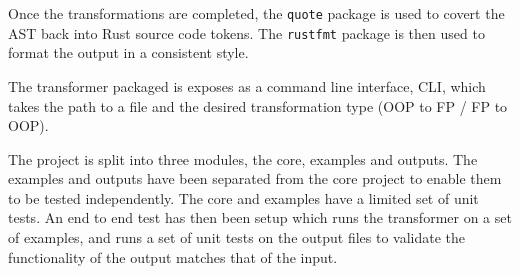 \documentclass[ oneside,%
                    author={James Elgar},
                    degree={MEng},
                     title={Bidirectional transformer between functional and \\ object-oriented programming in Rust},
                  subtitle={}]{dissertation}
\begin{document}
Once the transformations are completed, the \verb|quote| package is used to covert the AST back into Rust source code tokens. The \verb|rustfmt| package is then used to format the output in a consistent style.

The transformer packaged is exposes as a command line interface, CLI, which takes the path to a file and the desired transformation type (OOP to FP / FP to OOP). 

The project is split into three modules, the core, examples and outputs. The examples and outputs have been separated from the core project to enable them to be tested independently. The core and examples have a limited set of unit tests. An end to end test has then been setup which runs the transformer on a set of examples, and runs a set of unit tests on the output files to validate the functionality of the output matches that of the input.




\end{document}

